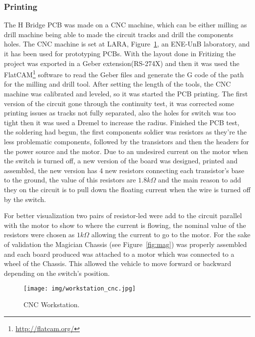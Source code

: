     \subsubsection{Printing} %
    \label{ssub:printing}
        The H Bridge PCB was made on a CNC machine, which can be either milling as drill machine being able to made the circuit tracks and drill the components holes. The CNC machine is set at LARA, Figure~\ref{fig:workstation}, an ENE-UnB laboratory, and it has been used for prototyping PCBs. With the layout done in Fritizing the project was exported in a Geber extension(RS-274X) and then it was used the FlatCAM\footnote{\url{http://flatcam.org/}} software to read the Geber files and generate the G code of the path for the milling and drill tool. After setting the length of the tools, the CNC machine was calibrated and leveled, so it was started the PCB printing. The first version of the circuit gone through the continuity test, it was corrected some printing issues as tracks not fully separated, also the holes for switch was too tight then it was used a Dremel to increase the radius. Finished the PCB test, the soldering had begun, the first components soldier was resistors as they're the less problematic components, followed by the transistors and then the headers for the power source and the motor. Due to an undesired current on the motor when the switch is turned off, a new version of the board was designed, printed and assembled, the new version has 4 new resistors connecting each transistor's base to the ground, the value of this resistors are $1.8k\Omega$ and the main reason to add they on the circuit is to pull down the floating current when the wire is turned off by the switch.
	
    For better visualization two pairs of resistor-led were add to the circuit parallel with the motor to show to where the current is flowing, the nominal value of the resistors were chosen as $1k\Omega$ allowing the current to go to the motor.
	For the sake of validation the Magician Chassis (see Figure~\ref{fig:mag}) was properly assembled and each board produced was attached to a motor which was connected to a wheel of the Chassis. This allowed the vehicle to move forward or backward depending on the switch's position.

\begin{figure}
\centering
\centering%
\texttt{[image: img/workstation\_cnc.jpg]}
\caption{CNC Workstation.}
\label{fig:workstation}%
\end{figure}

